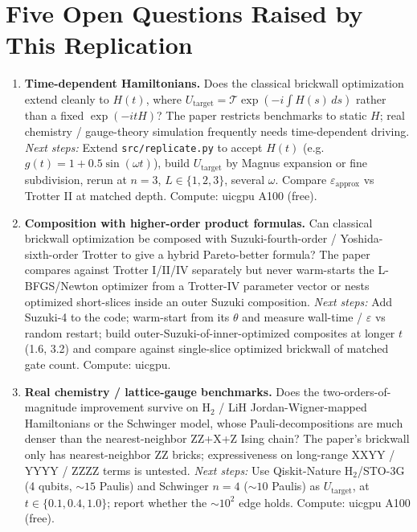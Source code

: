 \section*{Five Open Questions Raised by This Replication}

\begin{enumerate}

\item \textbf{Time-dependent Hamiltonians.} Does the classical brickwall optimization extend
cleanly to $H(t)$, where $U_{\text{target}} = \mathcal{T}\exp(-i\int H(s)\,ds)$ rather than a
fixed $\exp(-itH)$? The paper restricts benchmarks to static $H$; real chemistry / gauge-theory
simulation frequently needs time-dependent driving.
\emph{Next steps:} Extend \texttt{src/replicate.py} to accept $H(t)$ (e.g.\ $g(t) = 1 + 0.5\sin(\omega t)$),
build $U_{\text{target}}$ by Magnus expansion or fine subdivision, rerun at $n=3$, $L \in \{1,2,3\}$,
several $\omega$. Compare $\varepsilon_{\text{approx}}$ vs Trotter II at matched depth. Compute: uicgpu A100 (free).

\item \textbf{Composition with higher-order product formulas.} Can classical brickwall optimization
be composed with Suzuki-fourth-order / Yoshida-sixth-order Trotter to give a hybrid Pareto-better
formula? The paper compares against Trotter I/II/IV separately but never warm-starts the L-BFGS/Newton
optimizer from a Trotter-IV parameter vector or nests optimized short-slices inside an outer Suzuki
composition.
\emph{Next steps:} Add Suzuki-4 to the code; warm-start from its $\theta$ and measure wall-time /
$\varepsilon$ vs random restart; build outer-Suzuki-of-inner-optimized composites at longer $t$
(1.6, 3.2) and compare against single-slice optimized brickwall of matched gate count. Compute: uicgpu.

\item \textbf{Real chemistry / lattice-gauge benchmarks.} Does the two-orders-of-magnitude
improvement survive on H$_2$ / LiH Jordan-Wigner-mapped Hamiltonians or the Schwinger model, whose
Pauli-decompositions are much denser than the nearest-neighbor ZZ+X+Z Ising chain? The paper's
brickwall only has nearest-neighbor ZZ bricks; expressiveness on long-range XXYY / YYYY / ZZZZ terms
is untested.
\emph{Next steps:} Use Qiskit-Nature H$_2$/STO-3G (4 qubits, $\sim 15$ Paulis) and Schwinger $n=4$
($\sim 10$ Paulis) as $U_{\text{target}}$, at $t \in \{0.1, 0.4, 1.0\}$; report whether the $\sim 10^2$
edge holds. Compute: uicgpu A100 (free).


\end{enumerate}

